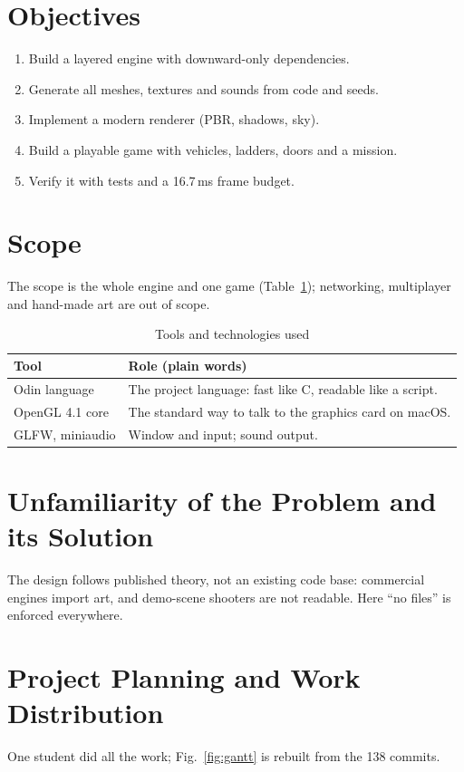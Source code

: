 \documentclass[12pt,a4paper,oneside]{report}
\begin{document}
\section{Objectives}
\begin{enumerate}[leftmargin=0.5in,label=\arabic*.,itemsep=0pt,topsep=0pt]
	\item Build a layered engine with downward-only dependencies.
	\item Generate all meshes, textures and sounds from code and seeds.
	\item Implement a modern renderer (PBR, shadows, sky).
	\item Build a playable game with vehicles, ladders, doors and a mission.
	\item Verify it with tests and a 16.7\,ms frame budget.
\end{enumerate}

\section{Scope}
The scope is the whole engine and one game (Table~\ref{tab:tools}); networking, multiplayer and hand-made art are out of scope.

\begin{table}[H]
	\caption{Tools and technologies used}\label{tab:tools}
	\small{}
	\begin{tabularx}{\linewidth}{lX}
		\toprule \textbf{Tool} & \textbf{Role (plain words)}\\ \midrule
		Odin language & The project language: fast like C, readable like a script.\\
		OpenGL 4.1 core & The standard way to talk to the graphics card on macOS.\\
		GLFW, miniaudio & Window and input; sound output.\\
		\bottomrule
	\end{tabularx}
\end{table}


\section{Unfamiliarity of the Problem and its Solution}
The design follows published theory, not an existing code base: commercial engines import art, and demo-scene shooters are not readable. Here ``no files'' is enforced everywhere.

\section{Project Planning and Work Distribution}
One student did all the work; Fig.~\ref{fig:gantt} is rebuilt from the 138 commits.
\end{document}
